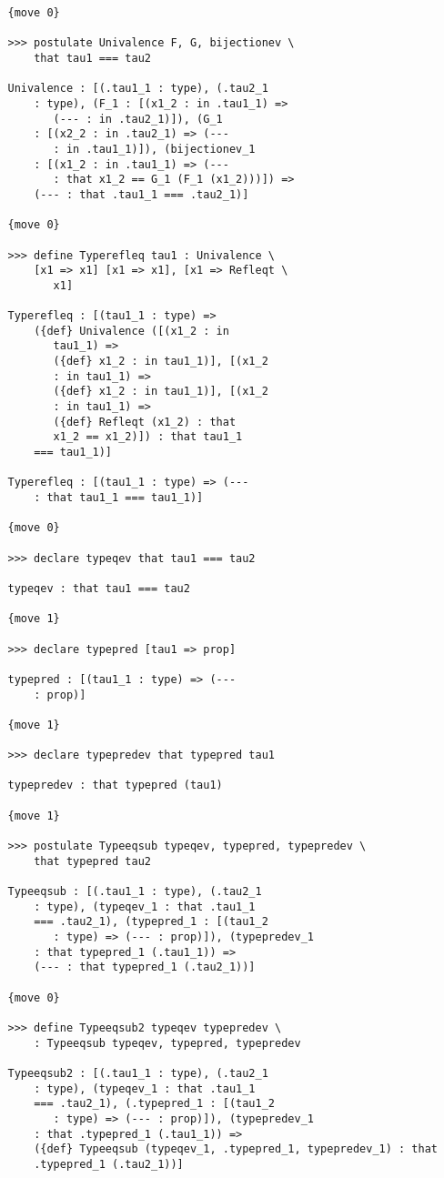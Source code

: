 \documentclass[12pt]{article}
\begin{document}
\begin{verbatim}
   {move 0}

   >>> postulate Univalence F, G, bijectionev \
       that tau1 === tau2

   Univalence : [(.tau1_1 : type), (.tau2_1 
       : type), (F_1 : [(x1_2 : in .tau1_1) => 
          (--- : in .tau2_1)]), (G_1 
       : [(x2_2 : in .tau2_1) => (--- 
          : in .tau1_1)]), (bijectionev_1 
       : [(x1_2 : in .tau1_1) => (--- 
          : that x1_2 == G_1 (F_1 (x1_2)))]) => 
       (--- : that .tau1_1 === .tau2_1)]

   {move 0}

   >>> define Typerefleq tau1 : Univalence \
       [x1 => x1] [x1 => x1], [x1 => Refleqt \
          x1]

   Typerefleq : [(tau1_1 : type) => 
       ({def} Univalence ([(x1_2 : in 
          tau1_1) => 
          ({def} x1_2 : in tau1_1)], [(x1_2 
          : in tau1_1) => 
          ({def} x1_2 : in tau1_1)], [(x1_2 
          : in tau1_1) => 
          ({def} Refleqt (x1_2) : that 
          x1_2 == x1_2)]) : that tau1_1 
       === tau1_1)]

   Typerefleq : [(tau1_1 : type) => (--- 
       : that tau1_1 === tau1_1)]

   {move 0}

   >>> declare typeqev that tau1 === tau2

   typeqev : that tau1 === tau2

   {move 1}

   >>> declare typepred [tau1 => prop]

   typepred : [(tau1_1 : type) => (--- 
       : prop)]

   {move 1}

   >>> declare typepredev that typepred tau1

   typepredev : that typepred (tau1)

   {move 1}

   >>> postulate Typeeqsub typeqev, typepred, typepredev \
       that typepred tau2

   Typeeqsub : [(.tau1_1 : type), (.tau2_1 
       : type), (typeqev_1 : that .tau1_1 
       === .tau2_1), (typepred_1 : [(tau1_2 
          : type) => (--- : prop)]), (typepredev_1 
       : that typepred_1 (.tau1_1)) => 
       (--- : that typepred_1 (.tau2_1))]

   {move 0}

   >>> define Typeeqsub2 typeqev typepredev \
       : Typeeqsub typeqev, typepred, typepredev

   Typeeqsub2 : [(.tau1_1 : type), (.tau2_1 
       : type), (typeqev_1 : that .tau1_1 
       === .tau2_1), (.typepred_1 : [(tau1_2 
          : type) => (--- : prop)]), (typepredev_1 
       : that .typepred_1 (.tau1_1)) => 
       ({def} Typeeqsub (typeqev_1, .typepred_1, typepredev_1) : that 
       .typepred_1 (.tau2_1))]


\end{verbatim}
\end{document}
